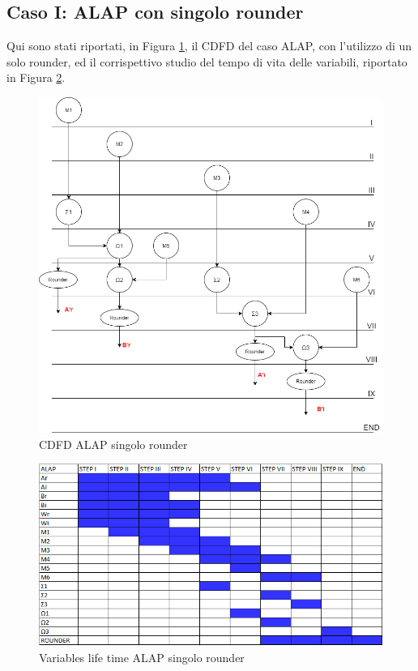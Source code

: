 \documentclass[a4paper, titlepage]{article}
\begin{document}
\subsection{Caso I: ALAP con singolo rounder} %
Qui sono stati riportati, in Figura \ref{fig:ALAP 1}, il CDFD del caso ALAP, con l'utilizzo di un solo rounder, ed il corrispettivo studio del tempo di vita delle variabili, riportato in Figura \ref{fig:tempo di vita delle variabili ALAP 1}.\\
\newpage
\begin{figure}[!h]
\centering
\includegraphics[scale=0.4]{DFD_ALAP 1.png}
\caption{CDFD ALAP singolo rounder}
\label{fig:ALAP 1}
\end{figure}
\begin{figure}[!h]
\centering
\includegraphics[scale=0.6]{Variables life time ALAP 1.PNG}
\caption{Variables life time ALAP singolo rounder}
\label{fig:tempo di vita delle variabili ALAP 1}
\end{figure}
\end{document}
